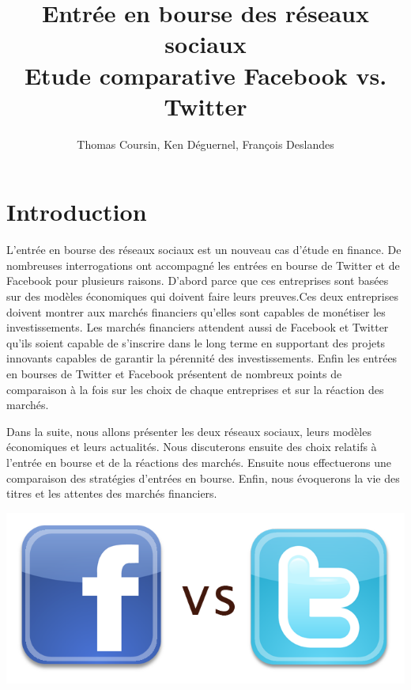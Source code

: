\documentclass[a4paper,10pt]{article}
\author{Thomas Coursin, Ken Déguernel, François Deslandes}
\affil{Génie Mathématique 5ème année}
\affil{A l'attention de Mme Lehmann}
\title{\Huge{Entrée en bourse des réseaux sociaux}\\
\LARGE{Etude comparative Facebook vs. Twitter}\\
\vspace{10mm}
}
\begin{document}
\maketitle\thispagestyle{empty}
 
\newpage\null\thispagestyle{empty}\setcounter{page}{0}

\tableofcontents

\clearpage



\section{Introduction}

L'entrée en bourse des réseaux sociaux est un nouveau cas d'étude en finance. De nombreuses interrogations ont accompagné les entrées en bourse de Twitter et de Facebook pour plusieurs raisons.
D'abord parce que ces entreprises sont basées sur des modèles économiques qui doivent faire leurs preuves.Ces deux entreprises doivent montrer aux marchés financiers qu'elles sont capables de monétiser les investissements.
Les marchés financiers attendent aussi de Facebook et Twitter qu'ils soient capable de s'inscrire dans le long terme en supportant des projets innovants capables de garantir la pérennité des investissements.
Enfin les entrées en bourses de Twitter et Facebook présentent de nombreux points de comparaison à la fois sur les choix de chaque entreprises et sur la réaction des marchés.


Dans la suite, nous allons présenter les deux réseaux sociaux, leurs modèles économiques et leurs actualités. Nous discuterons ensuite des choix relatifs à l'entrée en bourse et de la réactions des marchés. Ensuite nous effectuerons une comparaison des stratégies d'entrées en bourse. Enfin, nous évoquerons la vie des titres et les attentes des marchés financiers.

\vspace{1cm}
\begin{center}
\includegraphics[scale=0.3]{./images/facebook_vs_twitter.png}
\end{center}
\end{document}
